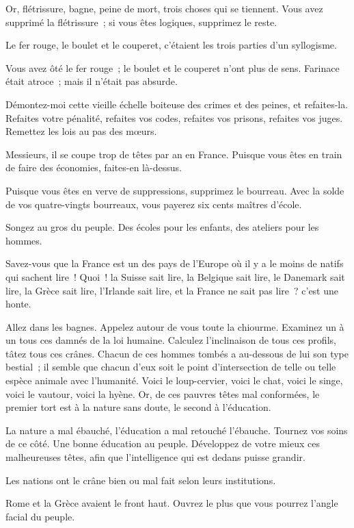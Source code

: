 \documentclass[french,twoside]{book} %
\begin{document}
Or, flétrissure, bagne, peine de mort, trois choses qui se tiennent. Vous avez supprimé la flétrissure ; si vous êtes logiques, supprimez le reste.\par
Le fer rouge, le boulet et le couperet, c’étaient les trois parties d’un syllogisme.\par
Vous avez ôté le fer rouge ; le boulet et le couperet n’ont plus de sens. Farinace était atroce ; mais il n’était pas absurde.\par
 Démontez-moi cette vieille échelle boiteuse des crimes et des peines, et refaites-la. Refaites votre pénalité, refaites vos codes, refaites vos prisons, refaites vos juges. Remettez les lois au pas des mœurs.\par
Messieurs, il se coupe trop de têtes par an en France. Puisque vous êtes en train de faire des économies, faites-en là-dessus.\par
Puisque vous êtes en verve de suppressions, supprimez le bourreau. Avec la solde de vos quatre-vingts bourreaux, vous payerez six cents maîtres d’école.\par
Songez au gros du peuple. Des écoles pour les enfants, des ateliers pour les hommes.\par
Savez-vous que la France est un des pays de l’Europe où il y a le moins de natifs qui sachent lire ! Quoi ! la Suisse sait lire, la Belgique sait lire, le Danemark sait lire, la Grèce sait lire, l’Irlande sait lire, et la France ne sait pas lire ? c’est une honte.\par
Allez dans les bagnes. Appelez autour de vous toute la chiourme. Examinez un à un tous ces damnés de la loi humaine. Calculez l’inclinaison de tous ces profils, tâtez tous ces crânes. Chacun de ces hommes tombés a au-dessous de lui son type bestial ; il semble que chacun d’eux soit le point d’intersection de telle ou telle espèce animale avec l’humanité. Voici le loup-cervier, voici le chat, voici le singe, voici le vautour, voici la hyène. Or, de ces pauvres têtes mal conformées, le premier tort est à la nature sans doute, le second à l’éducation.\par
La nature a mal ébauché, l’éducation a mal  retouché l’ébauche. Tournez vos soins de ce côté. Une bonne éducation au peuple. Développez de votre mieux ces malheureuses têtes, afin que l’intelligence qui est dedans puisse grandir.\par
Les nations ont le crâne bien ou mal fait selon leurs institutions.\par
Rome et la Grèce avaient le front haut. Ouvrez le plus que vous pourrez l’angle facial du peuple.\par
\end{document}
